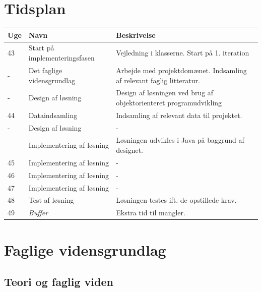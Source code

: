 \documentclass[a4paper,12pt]{report}
\begin{document}
\section{Tidsplan}
\begin{table}[H]
\begin{tabular}{| l | l | p{7cm} |}
\hline
\textbf{Uge} & \textbf{Navn}                 & \textbf{Beskrivelse}                               \\ \hline
43           & Start på implementeringsfasen & Vejledning i klasserne. Start på 1. iteration      \\ \hline
- & Det faglige vidensgrundlag & Arbejde med projektdomænet. Indsamling af relevant faglig litteratur. \\ \hline
- & Design af løsning          & Design af løsningen ved brug af objektorienteret programudvikling     \\ \hline
44           & Dataindsamling                & Indsamling af relevant data til projektet.         \\ \hline
-            & Design af løsning             & -                                                  \\ \hline
-            & Implementering af løsning     & Løsningen udvikles i Java på baggrund af designet. \\ \hline
45           & Implementering af løsning     & -                                                  \\ \hline
46           & Implementering af løsning     & -                                                  \\ \hline
47           & Implementering af løsning     & -                                                  \\ \hline
48           & Test af løsning               & Løsningen testes ift. de opstillede krav.          \\ \hline
49           & \textit{Buffer}               & Ekstra tid til mangler.                            \\ \hline
\end{tabular}
\end{table}

\section{Faglige vidensgrundlag}
\subsection{Teori og faglig viden}
\end{document}
